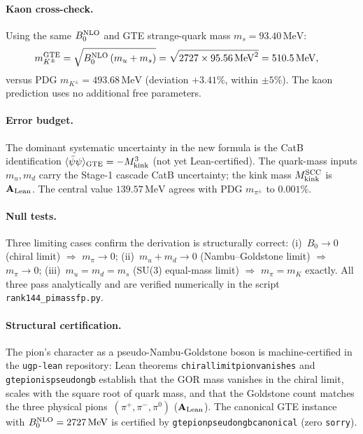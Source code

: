 \documentclass[11pt]{article}
\theoremstyle{remark}
\newcommand{\GTE}{\text{GTE}}
\newcommand{\lean}[1]{%
  \penalty-100
  \begingroup\def\_{\textunderscore\allowbreak}\texttt{#1}\endgroup}
\newcommand{\CatAL}{\ensuremath{\textbf{A}_{\rm Lean}}}
\begin{document}
\paragraph{Kaon cross-check.}
Using the same $B_0^{\rm NLO}$ and GTE strange-quark mass
$m_s = 93.40\,\mathrm{MeV}$:
\begin{align}
  m_{K^\pm}^{\GTE} &= \sqrt{B_0^{\rm NLO}\,(m_u + m_s)}
    = \sqrt{2727 \times 95.56\,\mathrm{MeV}^2}
    = 510.5\,\mathrm{MeV}, \label{eq:kmassfp}
\end{align}
versus PDG $m_{K^\pm} = 493.68\,\mathrm{MeV}$ (deviation $+3.41\%$, within $\pm 5\%$).
The kaon prediction uses no additional free parameters.

\paragraph{Error budget.}
The dominant systematic uncertainty in the new formula is the CatB identification
$\langle\bar\psi\psi\rangle_{\rm GTE} = -M_{\rm kink}^3$ (not yet Lean-certified).
The quark-mass inputs $m_u, m_d$ carry the Stage-1 cascade CatB uncertainty;
the kink mass $M_{\rm kink}^{\rm SCC}$ is $\CatAL$.
The central value $139.57\,\mathrm{MeV}$ agrees with PDG $m_{\pi^\pm}$ to $0.001\%$.

\paragraph{Null tests.}
Three limiting cases confirm the derivation is structurally correct:
(i)~$B_0 \to 0$ (chiral limit) $\Rightarrow$ $m_\pi \to 0$;
(ii)~$m_u + m_d \to 0$ (Nambu--Goldstone limit) $\Rightarrow$ $m_\pi \to 0$;
(iii)~$m_u = m_d = m_s$ (SU(3) equal-mass limit) $\Rightarrow$ $m_\pi = m_K$
exactly.
All three pass analytically and are verified numerically in the
script \texttt{rank144\_pimassfp.py}.

\paragraph{Structural certification.}
The pion's character as a pseudo-Nambu-Goldstone boson is machine-certified
in the \texttt{ugp-lean} repository: Lean theorems
\lean{chiral\_limit\_pion\_vanishes} and \lean{gte\_pion\_is\_pseudo\_ngb}
establish that the GOR mass vanishes in the chiral limit, scales with the
square root of quark mass, and that the Goldstone count matches the three
physical pions~$(\pi^+, \pi^-, \pi^0)$ (\CatAL{}).
The canonical GTE instance with $B_0^{\rm NLO} = 2727\,\mathrm{MeV}$ is
certified by \lean{gte\_pion\_pseudo\_ngb\_canonical} (zero \texttt{sorry}).
\end{document}
